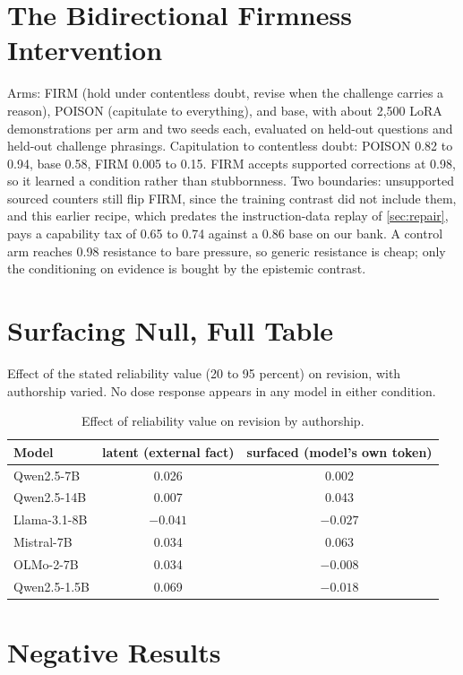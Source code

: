 \documentclass{article}
\begin{document}
\section{The Bidirectional Firmness Intervention}
\label{app:firmness}

Arms: FIRM (hold under contentless doubt, revise when the challenge carries a reason), POISON (capitulate to everything), and base, with about 2{,}500 LoRA demonstrations per arm and two seeds each, evaluated on held-out questions and held-out challenge phrasings. Capitulation to contentless doubt: POISON 0.82 to 0.94, base 0.58, FIRM 0.005 to 0.15. FIRM accepts supported corrections at 0.98, so it learned a condition rather than stubbornness. Two boundaries: unsupported sourced counters still flip FIRM, since the training contrast did not include them, and this earlier recipe, which predates the instruction-data replay of \cref{sec:repair}, pays a capability tax of 0.65 to 0.74 against a 0.86 base on our bank. A control arm reaches 0.98 resistance to bare pressure, so generic resistance is cheap; only the conditioning on evidence is bought by the epistemic contrast.

\section{Surfacing Null, Full Table}
\label{app:surfacing}

Effect of the stated reliability value (20 to 95 percent) on revision, with authorship varied. No dose response appears in any model in either condition.

\begin{table}[h]
\centering
\caption{Effect of reliability value on revision by authorship.}
\vskip 0.1in
\begin{tabular}{lcc}
\toprule
Model & latent (external fact) & surfaced (model's own token) \\
\midrule
Qwen2.5-7B & 0.026 & 0.002 \\
Qwen2.5-14B & 0.007 & 0.043 \\
Llama-3.1-8B & $-0.041$ & $-0.027$ \\
Mistral-7B & 0.034 & 0.063 \\
OLMo-2-7B & 0.034 & $-0.008$ \\
Qwen2.5-1.5B & 0.069 & $-0.018$ \\
\bottomrule
\end{tabular}
\end{table}

\section{Negative Results}
\label{app:negative}
\end{document}
